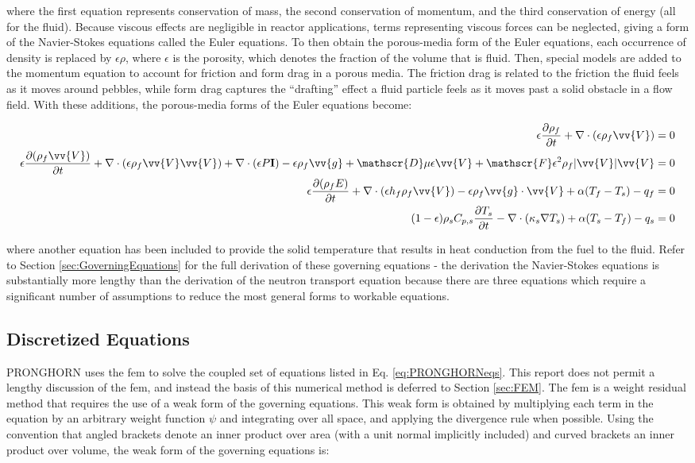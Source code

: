 \documentclass[10pt]{article}
\newcommand{\massconservation}{\epsilon\frac{\partial\rho_f}{\partial t} + \nabla\cdot(\epsilon\rho_f\vv{V})=0} %
\newcommand{\momentumconservation}{\epsilon\frac{\partial(\rho_f\vv{V})}{\partial t}+\nabla\cdot(\epsilon\rho_f\vv{V}\vv{V})+\nabla\cdot(\epsilon P\textbf{I})-\epsilon\rho_f\vv{g}+\mathscr{D}\mu\epsilon\vv{V}+\mathscr{F}\epsilon^2\rho_f|\vv{V}|\vv{V}=0} %
\newcommand{\fluidenergyconservation}{\epsilon\frac{\partial (\rho_f E)}{\partial t}+\nabla\cdot(\epsilon h_f\rho_f\vv{V})-\epsilon\rho_f \vv{g}\cdot\vv{V}+\alpha(T_f-T_s)-q_f=0} %
\newcommand{\solidenergyconservation}{(1-\epsilon)\rho_sC_{p,s}\frac{\partial T_s}{\partial t}-\nabla\cdot(\kappa_s\nabla T_s)+\alpha(T_s-T_f)-q_s=0} %
\numberwithin{equation}{section} %
\begin{document}
where the first equation represents conservation of mass, the second conservation of momentum, and the third conservation of energy (all for the fluid). Because viscous effects are negligible in reactor applications, terms representing viscous forces can be neglected, giving a form of the Navier-Stokes equations called the Euler equations. To then obtain the porous-media form of the Euler equations, each occurrence of density is replaced by \(\epsilon\rho\), where \(\epsilon\) is the porosity, which denotes the fraction of the volume that is fluid. Then, special models are added to the momentum equation to account for friction and form drag in a porous media. The friction drag is related to the friction the fluid feels as it moves around pebbles, while form drag captures the ``drafting'' effect a fluid particle feels as it moves past a solid obstacle in a flow field. With these additions, the porous-media forms of the Euler equations become:

\begin{equation}
\label{eq:PRONGHORNeqs}
\begin{aligned}
\massconservation\\
\momentumconservation\\
\fluidenergyconservation\\
\solidenergyconservation\\
\end{aligned}
\end{equation}

where another equation has been included to provide the solid temperature that results in heat conduction from the fuel to the fluid. Refer to Section \ref{sec:GoverningEquations} for the full derivation of these governing equations - the derivation the Navier-Stokes equations is substantially more lengthy than the derivation of the neutron transport equation because there are three equations which require a significant number of assumptions to reduce the most general forms to workable equations.

\subsection{Discretized Equations}

PRONGHORN uses the \gls{fem} to solve the coupled set of equations listed in Eq. \eqref{eq:PRONGHORNeqs}. This report does not permit a lengthy discussion of the \gls{fem}, and instead the basis of this numerical method is deferred to Section \ref{sec:FEM}. The \gls{fem} is a weight residual method that requires the use of a weak form of the governing equations. This weak form is obtained by multiplying each term in the equation by an arbitrary weight function \(\psi\) and integrating over all space, and applying the divergence rule when possible. Using the convention that angled brackets denote an inner product over area (with a unit normal implicitly included) and curved brackets an inner product over volume, the weak form of the governing equations is:
\end{document}
